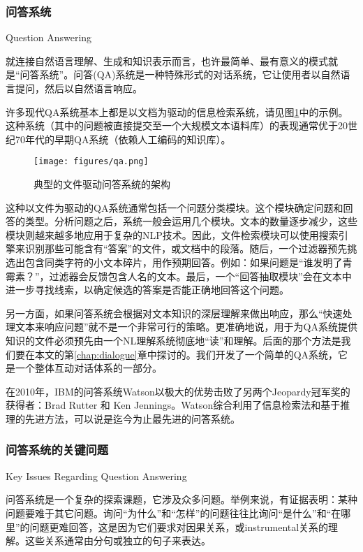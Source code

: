 \subsubsection{问答系统}{Question Answering}

就连接自然语言理解、生成和知识表示而言，也许最简单、最有意义的模式就是“问答系统”。问答(QA)系统是一种特殊形式的对话系统，它让使用者以自然语言提问，然后以自然语言响应。


许多现代QA系统基本上都是以文档为驱动的信息检索系统，请见图\ref{fig:qa}中的示例\cite{Hirschman2001}。这种系统（其中的问题被直接提交至一个大规模文本语料库）的表现通常优于20世纪70年代的早期QA系统（依赖人工编码的知识库）。

\begin{figure}[htb]
\centering
\texttt{[image: figures/qa.png]}
\caption{典型的文件驱动问答系统的架构}
\label{fig:qa}
\end{figure}

这种以文件为驱动的QA系统通常包括一个问题分类模块。这个模块确定问题和回答的类型。分析问题之后，系统一般会运用几个模块。文本的数量逐步减少，这些模块则越来越多地应用于复杂的NLP技术。因此，文件检索模块可以使用搜索引擎来识别那些可能含有“答案”的文件，或文档中的段落。随后，一个过滤器预先挑选出包含同类字符的小文本碎片，用作预期回答。例如：如果问题是“谁发明了青霉素？”，过滤器会反馈包含人名的文本。最后，一个“回答抽取模块”会在文本中进一步寻找线索，以确定候选的答案是否能正确地回答这个问题。

另一方面，如果问答系统会根据对文本知识的深层理解来做出响应，那么“快速处理文本来响应问题”就不是一个非常可行的策略。更准确地说，用于为QA系统提供知识的文件必须预先由一个NL理解系统彻底地“读”和理解。后面的那个方法是我们要在本文的第\ref{chap:dialogue}章中探讨的。我们开发了一个简单的QA系统，它是一个整体互动对话体系的一部分。

在2010年，IBM的问答系统Watson以极大的优势击败了另两个Jeopardy冠军奖的获得者：Brad Rutter 和 Ken Jennings。Watson综合利用了信息检索法和基于推理的先进方法\cite{Ferrucci2011}，可以说是迄今为止最先进的问答系统。

\subsubsection{问答系统的关键问题}{Key Issues Regarding Question Answering}

问答系统是一个复杂的探索课题，它涉及众多问题。举例来说，有证据表明：某种问题要难于其它问题。询问“为什么”和“怎样”的问题往往比询问“是什么”和“在哪里”的问题更难回答，这是因为它们要求对因果关系，或instrumental关系的理解。这些关系通常由分句或独立的句子来表达\cite{Hirschman1999}。

